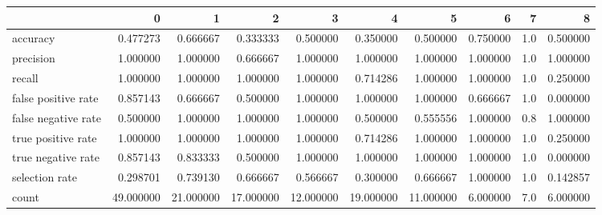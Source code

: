 \begin{tabular}{lrrrrrrrrr}
\toprule
{} &          0 &          1 &          2 &          3 &          4 &          5 &         6 &    7 &         8 \\
\midrule
accuracy            &   0.477273 &   0.666667 &   0.333333 &   0.500000 &   0.350000 &   0.500000 &  0.750000 &  1.0 &  0.500000 \\
precision           &   1.000000 &   1.000000 &   0.666667 &   1.000000 &   1.000000 &   1.000000 &  1.000000 &  1.0 &  1.000000 \\
recall              &   1.000000 &   1.000000 &   1.000000 &   1.000000 &   0.714286 &   1.000000 &  1.000000 &  1.0 &  0.250000 \\
false positive rate &   0.857143 &   0.666667 &   0.500000 &   1.000000 &   1.000000 &   1.000000 &  0.666667 &  1.0 &  0.000000 \\
false negative rate &   0.500000 &   1.000000 &   1.000000 &   1.000000 &   0.500000 &   0.555556 &  1.000000 &  0.8 &  1.000000 \\
true positive rate  &   1.000000 &   1.000000 &   1.000000 &   1.000000 &   0.714286 &   1.000000 &  1.000000 &  1.0 &  0.250000 \\
true negative rate  &   0.857143 &   0.833333 &   0.500000 &   1.000000 &   1.000000 &   1.000000 &  1.000000 &  1.0 &  0.000000 \\
selection rate      &   0.298701 &   0.739130 &   0.666667 &   0.566667 &   0.300000 &   0.666667 &  1.000000 &  1.0 &  0.142857 \\
count               &  49.000000 &  21.000000 &  17.000000 &  12.000000 &  19.000000 &  11.000000 &  6.000000 &  7.0 &  6.000000 \\
\bottomrule
\end{tabular}
